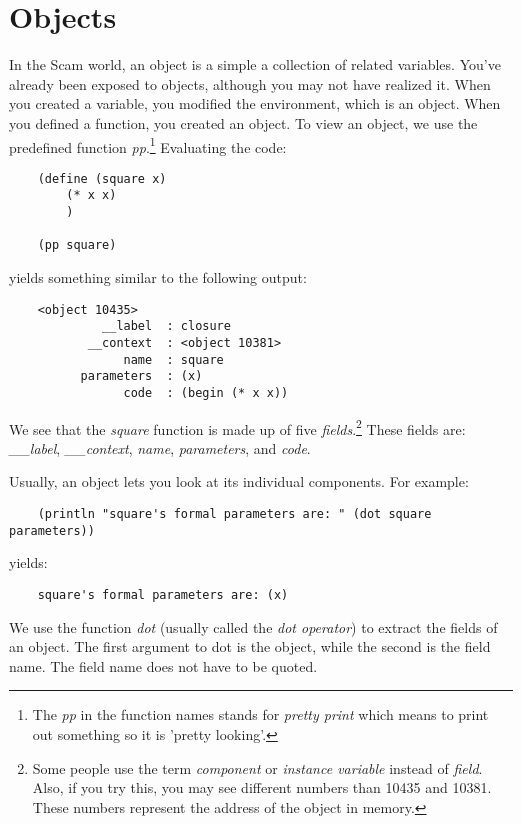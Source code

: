 \chapter{Objects}
\label{Objects}

In the Scam world, an object is a simple a collection of related variables.
You've already been exposed to objects, although you may not
have realized it. When you created a variable, you modified
the environment, which is an object. When you defined a
function, you created 
an object. To view an object, we use the predefined function
{\it pp}.\footnote{
The {\it pp} in the function names stands for {\it pretty print} which
means to print out something so it is 'pretty looking'.
} Evaluating the code:

\begin{verbatim}
    (define (square x)
        (* x x)
        )
    
    (pp square)
\end{verbatim}

yields something similar to the following output:

\begin{verbatim}
    <object 10435>
             __label  : closure
           __context  : <object 10381>
                name  : square
          parameters  : (x)
                code  : (begin (* x x))
\end{verbatim}

We see that the {\it square} function is made up of five {\it fields}.\footnote{
Some people use the term {\it component} or {\it instance variable} instead
of {\it field}.
Also, if you try this, you may see different numbers than 10435 and 10381.
These numbers represent the address of the object in memory.
}
These fields are: {\it \_\_label}, {\it \_\_context}, {\it name},
{\it parameters},
and {\it code}.

Usually, an object lets you look at its individual components.
For example:

\begin{verbatim}
    (println "square's formal parameters are: " (dot square parameters))
\end{verbatim}

yields:

\begin{verbatim}
    square's formal parameters are: (x)
\end{verbatim}
    
We use the function {\it dot} (usually called the {\it dot operator}) to extract
the fields of an object. The first argument to dot is the object, while
the second is the field name. The field name does not have to be quoted.

